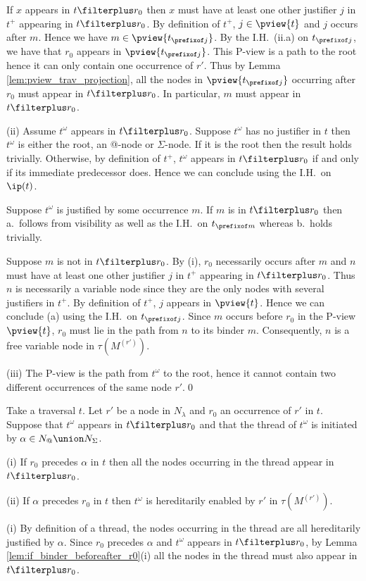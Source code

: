 If $x$ appears in $t\filterplus r_0$ then $x$ must have at least one
other justifier $j$ in $t^+$ appearing in $t\filterplus r_0$. By
definition of $t^+$, $j\in \pview{t}$ and $j$ occurs after $m$.
Hence we have $m \in \pview{t_{\prefixof j}}$. By the I.H.\ (ii.a)
on $t_{\prefixof j}$, we have that $r_0$ appears in
$\pview{t_{\prefixof j}}$. This P-view is a path to the root hence
it can only contain one occurrence of $r'$. Thus by Lemma
\ref{lem:pview_trav_projection}, all the nodes in
$\pview{t_{\prefixof j}}$ occurring after $r_0$ must appear in
$t\filterplus r_0$. In particular, $m$ must appear in $t\filterplus
r_0$.

\noindent (ii) Assume $t^\omega$ appears in $t\filterplus r_0$.
Suppose $t^\omega$ has no justifier in $t$ then $t^\omega$ is either the root, an @-node or $\Sigma$-node. If it is the root then the result holds trivially. Otherwise, by definition of $t^+$, $t^\omega$
appears in $t\filterplus r_0$ if and only if its immediate predecessor does. Hence we can conclude using the I.H.\ on $\ip(t)$.

Suppose $t^\omega$ is justified by some occurrence $m$.
If $m$ is in $t\filterplus r_0$ then a.\ follows from
visibility as well as the I.H.\ on $t_{\prefixof m}$ whereas b.\ holds trivially.

Suppose $m$ is not in $t\filterplus r_0$.
By (i), $r_0$ necessarily occurs after $m$ and $n$ must have at least one other justifier $j$ in $t^+$ appearing in $t\filterplus r_0$. Thus $n$ is necessarily a variable node since they are the only nodes with several justifiers in $t^+$. By definition of $t^+$, $j$ appears in $\pview{t}$. Hence we can conclude (a) using the I.H.\ on $t_{\prefixof j}$. Since $m$ occurs before $r_0$ in the P-view $\pview{t}$, $r_0$ must lie in the path from $n$ to its binder $m$. Consequently, $n$ is a free variable node in $\tau(M^{(r')})$.

\noindent (iii) The P-view is the path from $t^\omega$ to the root, hence it cannot contain two different occurrences of the same node $r'$.\qed



\begin{lemma}
\label{lem:thread_projplus} Take a traversal $t$.  Let $r'$ be a
node in $N_\lambda$ and $r_0$ an occurrence of $r'$ in $t$. Suppose
that $t^\omega$ appears in $t\filterplus r_0$ and that the thread of
$t^\omega$ is initiated by $\alpha \in N_@ \union N_\Sigma$.

(i) If $r_0$ precedes $\alpha$ in $t$ then all the nodes occurring in the thread appear in $t\filterplus r_0$.

(ii) If $\alpha$ precedes $r_0$ in $t$ then
    $t^\omega$ is hereditarily enabled by $r'$ in $\tau(M^{(r')})$.
\end{lemma}
\proof
(i) By definition of a thread, the nodes occurring in the thread
are all hereditarily justified by $\alpha$.
Since $r_0$ precedes $\alpha$ and $t^\omega$ appears in $t\filterplus r_0$, by Lemma \ref{lem:if_binder_beforeafter_r0}(i) all the nodes in the thread must also appear in $t \filterplus r_0$.


